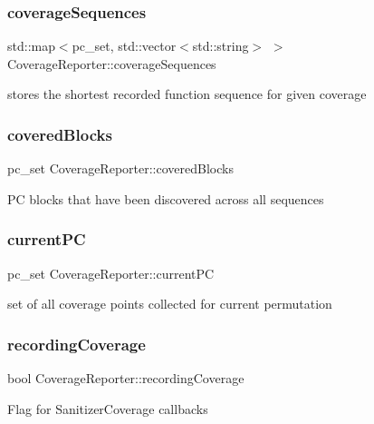 \subsubsection{\texorpdfstring{coverage\+Sequences}{coverageSequences}}
{\footnotesize\ttfamily std\+::map$<$pc\+\_\+set, std\+::vector$<$std\+::string$>$ $>$ Coverage\+Reporter\+::coverage\+Sequences}

stores the shortest recorded function sequence for given coverage \mbox{\label{classCoverageReporter_a180661161246c7f350d19ad4dfd82680}} 
\subsubsection{\texorpdfstring{covered\+Blocks}{coveredBlocks}}
{\footnotesize\ttfamily pc\+\_\+set Coverage\+Reporter\+::covered\+Blocks}

PC blocks that have been discovered across all sequences \mbox{\label{classCoverageReporter_a731717e0ad503323a0b541b8c1497080}} 
\subsubsection{\texorpdfstring{current\+PC}{currentPC}}
{\footnotesize\ttfamily pc\+\_\+set Coverage\+Reporter\+::current\+PC}

set of all coverage points collected for current permutation \mbox{\label{classCoverageReporter_a045c6e4451868fd74701c659f85e25c4}} 
\subsubsection{\texorpdfstring{recording\+Coverage}{recordingCoverage}}
{\footnotesize\ttfamily bool Coverage\+Reporter\+::recording\+Coverage}

Flag for Sanitizer\+Coverage callbacks 
